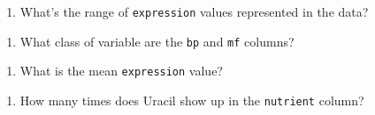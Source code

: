 \documentclass[]{article}
\newenvironment{Shaded}{\begin{snugshade}}{\end{snugshade}}
\newcommand{\KeywordTok}[1]{\textcolor[rgb]{0.13,0.29,0.53}{\textbf{#1}}}
\newcommand{\OperatorTok}[1]{\textcolor[rgb]{0.81,0.36,0.00}{\textbf{#1}}}
\newcommand{\NormalTok}[1]{#1}
\providecommand{\tightlist}{%
  \setlength{\itemsep}{0pt}\setlength{\parskip}{0pt}}
\begin{document}
\begin{enumerate}
\def\labelenumi{\arabic{enumi}.}
\setcounter{enumi}{2}
\tightlist
\item
  What's the range of \texttt{expression} values represented in the
  data?
\end{enumerate}

\begin{Shaded}
\end{Shaded}

\begin{enumerate}
\def\labelenumi{\arabic{enumi}.}
\setcounter{enumi}{3}
\tightlist
\item
  What class of variable are the \texttt{bp} and \texttt{mf} columns?
\end{enumerate}

\begin{Shaded}
\end{Shaded}

\begin{enumerate}
\def\labelenumi{\arabic{enumi}.}
\setcounter{enumi}{4}
\tightlist
\item
  What is the mean \texttt{expression} value?
\end{enumerate}

\begin{Shaded}
\end{Shaded}

\begin{enumerate}
\def\labelenumi{\arabic{enumi}.}
\setcounter{enumi}{5}
\tightlist
\item
  How many times does Uracil show up in the \texttt{nutrient} column?
\end{enumerate}

\begin{Shaded}
\end{Shaded}
\end{document}
